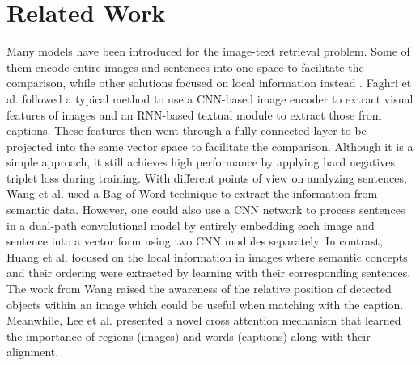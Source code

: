\documentclass{IOS-Book-Article}
\begin{document}
\section{Related Work}
Many models have been introduced for the image-text retrieval problem. Some of them \cite{faghri2017vse++,wang2017adversarial,zheng2020dualpath} encode entire images and sentences into one space to facilitate the comparison, while other solutions focused on local information instead \cite{huang2018learning,lee2018stacked,wang2019position}. Faghri et al. \cite{faghri2017vse++} followed a typical method to use a CNN-based image encoder to extract visual features of images and an RNN-based textual module to extract those from captions. These features then went through a fully connected layer to be projected into the same vector space to facilitate the comparison. Although it is a simple approach, it still achieves high performance by applying hard negatives triplet loss during training. With different points of view on analyzing sentences, Wang et al. \cite{wang2017adversarial} used a Bag-of-Word technique to extract the information from semantic data. However, one could also use a CNN network to process sentences in a dual-path convolutional model \cite{zheng2020dualpath} by entirely embedding each image and sentence into a vector form using two CNN modules separately. In contrast, Huang et al. \cite{huang2018learning} focused on the local information in images where semantic concepts and their ordering were extracted by learning with their corresponding sentences. The work from Wang \cite{wang2019position} raised the awareness of the relative position of detected objects within an image which could be useful when matching with the caption. Meanwhile, Lee et al. \cite{lee2018stacked} presented a novel cross attention mechanism that learned the importance of regions (images) and words (captions) along with their alignment.
\end{document}
